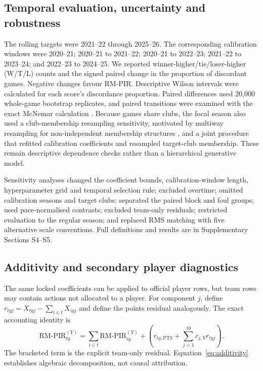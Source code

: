 \documentclass[pdflatex,sn-mathphys-num]{sn-jnl}
\newcommand{\rmpir}{\mathrm{RM\text{-}PIR}}
\begin{document}
\subsection{Temporal evaluation, uncertainty and robustness}

The rolling targets were 2021--22 through 2025--26. The corresponding calibration windows were 2020--21; 2020--21 to 2021--22; 2020--21 to 2022--23; 2021--22 to 2023--24; and 2022--23 to 2024--25. We reported winner-higher/tie/loser-higher (W/T/L) counts and the signed paired change in the proportion of discordant games. Negative changes favour RM-PIR. Descriptive Wilson intervals were calculated for each score's discordance proportion. Paired differences used 20,000 whole-game bootstrap replicates, and paired transitions were examined with the exact McNemar calculation \cite{wilson1927,mcnemar1947,efron1979,efron1993}. Because games share clubs, the focal season also used a club-membership resampling sensitivity, motivated by multiway resampling for non-independent membership structures \cite{Owen2007}, and a joint procedure that refitted calibration coefficients and resampled target-club membership. These remain descriptive dependence checks rather than a hierarchical generative model.

Sensitivity analyses changed the coefficient bounds, calibration-window length, hyperparameter grid and temporal selection rule; excluded overtime; omitted calibration seasons and target clubs; separated the paired block and foul groups; used pace-normalised contrasts; excluded team-only residuals; restricted evaluation to the regular season; and replaced RMS matching with five alternative scale conventions. Full definitions and results are in Supplementary Sections S4--S5.

\subsection{Additivity and secondary player diagnostics}

The same locked coefficients can be applied to official player rows, but team rows may contain actions not allocated to a player. For component \(j\), define \(r_{tgj}=X_{tgj}-\sum_{i\in t}X_{igj}\) and define the points residual analogously. The exact accounting identity is
\begin{equation}
\rmpir_{tg}^{(Y)}=
\sum_{i\in t}\rmpir_{ig}^{(Y)}+
\left(r_{tg,\mathrm{PTS}}+\sum_{j=1}^{10}c_{j,Y}r_{tgj}\right).
\label{eq:additivity}
\end{equation}
The bracketed term is the explicit team-only residual. Equation~\ref{eq:additivity} establishes algebraic decomposition, not causal attribution.
\end{document}
